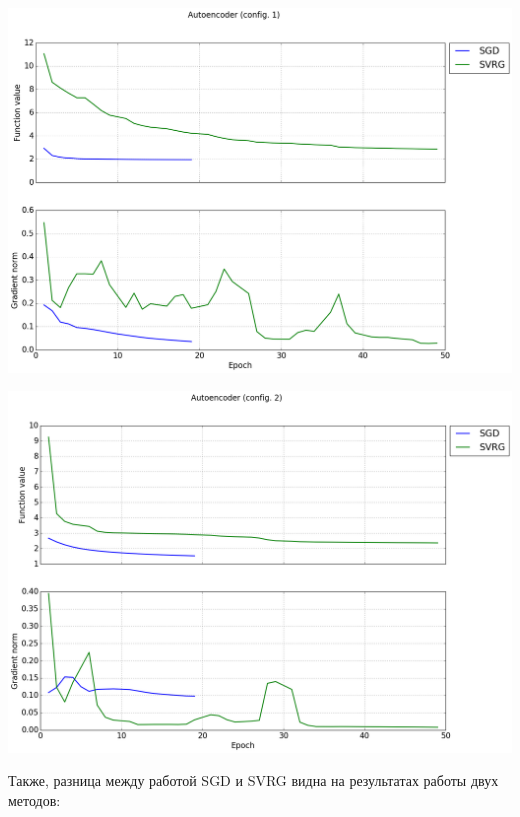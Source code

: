 \documentclass[12pt, a4paper]{article}
\begin{document}
    \begin{center}\includegraphics[width=\picwidth]{cmp_ae1.png}\end{center}
    \begin{center}\includegraphics[width=\picwidth]{cmp_ae2.png}\end{center}

    Также, разница между работой SGD и SVRG видна на результатах работы двух методов:
\end{document}
